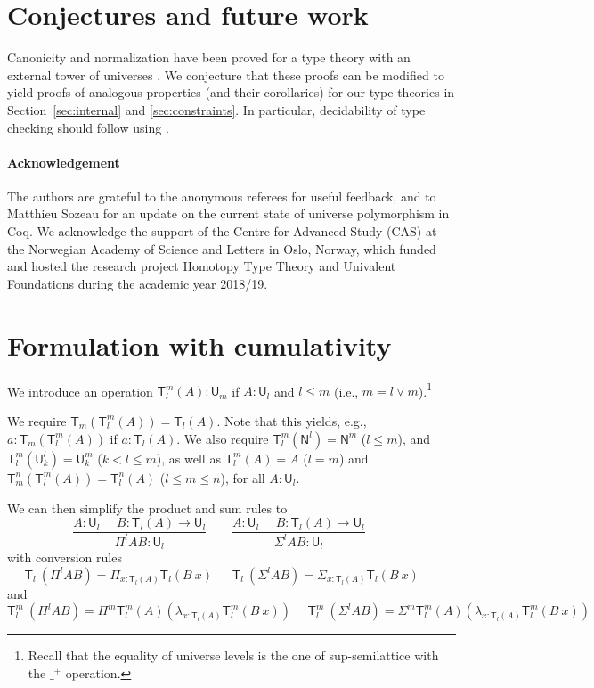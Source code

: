 \documentclass[a4paper,UKenglish,cleveref, autoref, thm-restate]{lipics-v2021}
\newcommand{\NN}{\mathsf{N}}
\newcommand{\UU}{\mathsf{U}}
\newcommand{\mylam}[3]{\lambda_{#1:#2}#3}
\newcommand{\mypi}[3]{\Pi_{#1:#2}#3}
\newcommand{\mysig}[3]{\Sigma_{#1:#2}#3}
\newcommand{\T}{\mathsf{T}}
\begin{document}
\section{Conjectures and future work}\label{sec:future}

Canonicity and normalization have been proved for a type theory with an external tower of universes \cite{coquand:tcs2019}. We conjecture that these proofs can be modified to yield proofs of analogous properties (and their corollaries) for our type theories in Section~\ref{sec:internal} and \ref{sec:constraints}.
%
In particular, decidability of type checking should follow using
\cite{bezem-coquand:lattices}.

\paragraph*{Acknowledgement}
The authors are grateful to the anonymous referees for useful feedback,
and to Matthieu Sozeau for an update on the current state
of universe polymorphism in Coq.
We acknowledge the support of the Centre for Advanced Study (CAS)
at the Norwegian Academy of Science and Letters
in Oslo, Norway, which funded and hosted the research project Homotopy
Type Theory and Univalent Foundations during the academic year 2018/19.



\newpage

\appendix

\section{Formulation with cumulativity} \label{appendix:1}


We introduce an operation $\T_{l}^{m}(A):\UU_{m}$ if $A:\UU_{l}$
and $l\leqslant m$ (i.e., $m = l\vee m$).\footnote{%
Recall that the equality of universe levels is the one of
sup-semilattice with the $\_^+$ operation.}

We require $\T_{m}(\T_{l}^{m}(A)) = \T_{l}(A)$. Note that this
yields, e.g., $a:\T_{m}(\T_{l}^{m}(A))$ if $a:\T_{l}(A)$.
We also require $\T_{l}^{m}(\NN^{l}) = \NN^{m}$ ($l\leqslant m$),
and $\T_{l}^{m}(\UU_{k}^l) = \UU_{k}^{m}$ ($k<l\leqslant m$),
as well as $\T_{l}^m(A) = A$ ($l=m$)
and $\T_{m}^n(\T_{l}^m(A)) = \T_l^n(A)$ ($l\leqslant m\leqslant n$),
for all $A:\UU_l$.

We can then simplify the product and sum rules to
$$
\frac{A:\UU_{l}~~~~~~B:\T_{l}(A)\rightarrow \UU_{l}}
     {\Pi^{l} A B:\UU_{l}}~~~~~~~~~
\frac{A:\UU_{l}~~~~~~B:\T_{l}(A)\rightarrow \UU_{l}}
     {\Sigma^{l} A B:\UU_{l}}~~~~~~~~~
$$
with conversion rules
$$
\T_{l}~(\Pi^{l} A B) = \mypi{x}{\T_{l}(A)}{ \T_{l}(B~x)}~~~~~~~
\T_{l}~(\Sigma^{l} A B) =  \mysig{x}{\T_{l}(A)}{ \T_{l}(B~x)}~~~~~~~
$$
and
$$
\T_{l}^{m}~(\Pi^{l} A B) = \Pi^{m} \T_{l}^{m}(A) (\mylam {x}{\T_{l}(A)}{\T_{l}^{m}(B~x)})~~~~~~
\T_{l}^{m}~(\Sigma^{l} A B) = \Sigma^{m} \T_{l}^{m}(A) (\mylam {x}{\T_{l}(A)}{\T_{l}^{m}(B~x)})~~~~~~
$$
\end{document}
